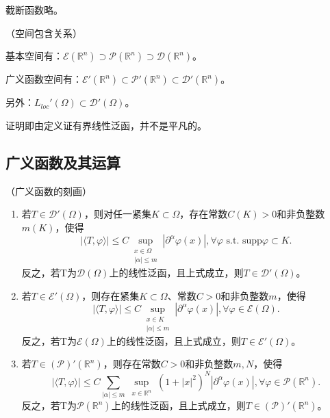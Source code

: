 截断函数略。

\begin{prop}（空间包含关系）

  基本空间有：$\mathscr{E}(\mathbb{R}^n) \supset \mathscr{P}(\mathbb{R}^n) \supset \mathscr{D}(\mathbb{R}^n)$。
  
  广义函数空间有：$\mathscr{E}'(\mathbb{R}^n) \subset \mathscr{P}'(\mathbb{R}^n) \subset \mathscr{D}'(\mathbb{R}^n)$。

  另外：$L_{loc}'(\Omega) \subset \mathscr{D}'(\Omega)$。
\end{prop}

证明即由定义证有界线性泛函，并不是平凡的。

\subsection{广义函数及其运算}

\begin{thm}（广义函数的刻画）

  \begin{enumerate}
    \item 若$T \in \mathscr{D}'(\Omega)$，则对任一紧集$K \subset \Omega$，存在常数$C(K) > 0$和非负整数$m(K)$，使得
    \[
      |\langle T, \varphi\rangle| \leqslant C \sup _{\substack{x \in \Omega \\|\alpha| \leqslant m}}\left|\partial^{\alpha} \varphi(x)\right|, \forall \varphi \text{ s.t. supp} \varphi \subset K.
    \]
    反之，若T为$\mathscr{D}(\Omega)$上的线性泛函，且上式成立，则$T \in \mathscr{D}'(\Omega)$。
    \item 若$T \in \mathscr{E}'(\Omega)$，则存在紧集$K \subset \Omega$、常数$C > 0$和非负整数$m$，使得
    \[
      |\langle T, \varphi\rangle| \leqslant C \sup _{\substack{x \in K \\|\alpha| \leqslant m}}\left|\partial^{\alpha} \varphi(x)\right|, \forall \varphi \in \mathscr{E}(\Omega).
    \]
    反之，若T为$\mathscr{E}(\Omega)$上的线性泛函，且上式成立，则$T \in \mathscr{E}'(\Omega)$。
    \item 若$T \in (\mathscr{P})'(\mathbb{R}^n)$，则存在常数$C > 0$和非负整数$m, N$，使得
    \[
      |\langle T, \varphi\rangle| \leqslant C \sum_{|\alpha| \leqslant m} \sup _{\substack{x \in \mathbb{R}^n}} {(1 + |x|^2)}^N \left|\partial^{\alpha} \varphi(x)\right|, \forall \varphi \in \mathscr{P}(\mathbb{R}^n).
    \]
    反之，若T为$\mathscr{P}(\mathbb{R}^n)$上的线性泛函，且上式成立，则$T \in (\mathscr{P})'(\mathbb{R}^n)$。
  \end{enumerate}
\end{thm}

